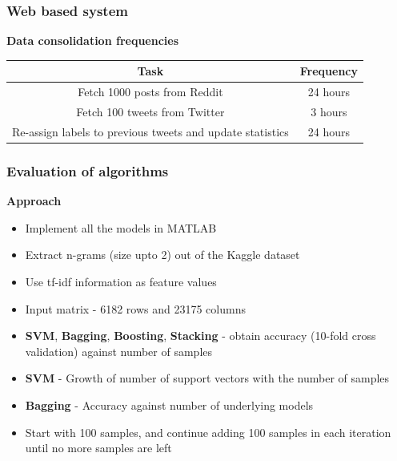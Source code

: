 \documentclass{beamer}
\begin{document}
    \begin{frame}
        \frametitle{Web based system}
        \begin{center}
            \textbf{Data consolidation frequencies}
        \end{center}
        \begin{table}
            \begin{center}
                \begin{tabular}{ | c | c | }
                    \hline
                    \textbf{Task} & \textbf{Frequency} \\
                    \hline
                    Fetch 1000 posts from Reddit & 24 hours \\
                    \hline
                    Fetch 100 tweets from Twitter & 3 hours \\
                    \hline
                    Re-assign labels to previous tweets and update statistics & 24 hours \\
                    \hline
                \end{tabular}
            \end{center}
        \end{table}
    \end{frame}
    
    \begin{frame}
        \frametitle{Evaluation of algorithms}
        \begin{center}
            \textbf{Approach}
        \end{center}
        \begin{itemize}
            \item{Implement all the models in MATLAB}
            \item{Extract n-grams (size upto 2) out of the Kaggle dataset}
            \item{Use tf-idf information as feature values}
            \item{Input matrix - 6182 rows and 23175 columns}
            \item{\textbf{SVM}, \textbf{Bagging}, \textbf{Boosting}, \textbf{Stacking} - obtain accuracy (10-fold cross validation) against number of samples}
            \item{\textbf{SVM} - Growth of number of support vectors with the number of samples}
            \item{\textbf{Bagging} - Accuracy against number of underlying models}
            \item{Start with 100 samples, and continue adding 100 samples in each iteration until no more samples are left}
        \end{itemize}
    \end{frame}
    
\end{document}
